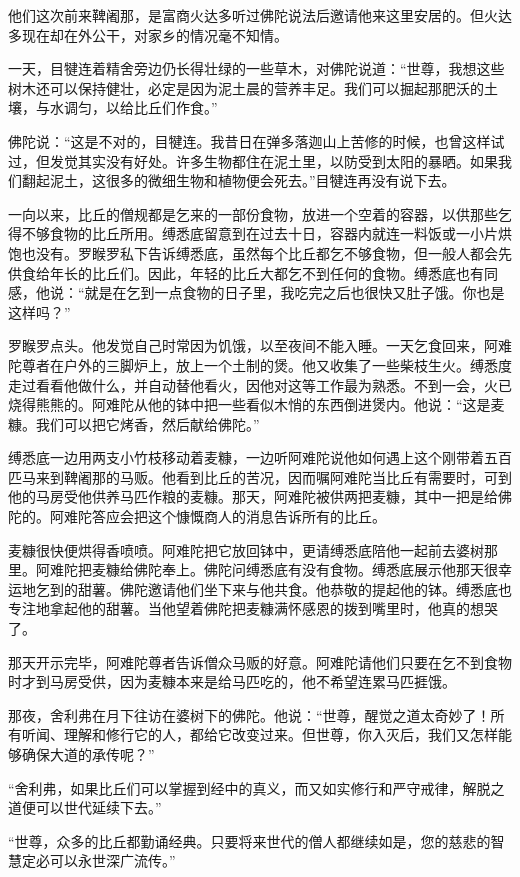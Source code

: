 \documentclass[12pt,twoside,openany]{book}
\begin{document}
他们这次前来鞞阇那，是富商火达多听过佛陀说法后邀请他来这里安居的。但火达多现在却在外公干，对家乡的情况毫不知情。

一天，目犍连着精舍旁边仍长得壮绿的一些草木，对佛陀说道：“世尊，我想这些树木还可以保持健壮，必定是因为泥土晨的营养丰足。我们可以掘起那肥沃的土壤，与水调匀，以给比丘们作食。”

佛陀说：“这是不对的，目犍连。我昔日在弹多落迦山上苦修的时候，也曾这样试过，但发觉其实没有好处。许多生物都住在泥土里，以防受到太阳的暴晒。如果我们翻起泥土，这很多的微细生物和植物便会死去。”目犍连再没有说下去。

一向以来，比丘的僧规都是乞来的一部份食物，放进一个空着的容器，以供那些乞得不够食物的比丘所用。缚悉底留意到在过去十日，容器内就连一料饭或一小片烘饱也没有。罗睺罗私下告诉缚悉底，虽然每个比丘都乞不够食物，但一般人都会先供食给年长的比丘们。因此，年轻的比丘大都乞不到任何的食物。缚悉底也有同感，他说：“就是在乞到一点食物的日子里，我吃完之后也很快又肚子饿。你也是这样吗？”

罗睺罗点头。他发觉自己时常因为饥饿，以至夜间不能入睡。一天乞食回来，阿难陀尊者在户外的三脚炉上，放上一个土制的煲。他又收集了一些柴枝生火。缚悉度走过看看他做什么，并自动替他看火，因他对这等工作最为熟悉。不到一会，火已烧得熊熊的。阿难陀从他的钵中把一些看似木悄的东西倒进煲内。他说：“这是麦糠。我们可以把它烤香，然后献给佛陀。”

缚悉底一边用两支小竹枝移动着麦糠，一边听阿难陀说他如何遇上这个刚带着五百匹马来到鞞阇那的马贩。他看到比丘的苦况，因而嘱阿难陀当比丘有需要时，可到他的马房受他供养马匹作粮的麦糠。那天，阿难陀被供两把麦糠，其中一把是给佛陀的。阿难陀答应会把这个慷慨商人的消息告诉所有的比丘。

麦糠很快便烘得香喷喷。阿难陀把它放回钵中，更请缚悉底陪他一起前去婆树那里。阿难陀把麦糠给佛陀奉上。佛陀问缚悉底有没有食物。缚悉底展示他那天很幸运地乞到的甜薯。佛陀邀请他们坐下来与他共食。他恭敬的提起他的钵。缚悉底也专注地拿起他的甜薯。当他望着佛陀把麦糠满怀感恩的拨到嘴里时，他真的想哭了。

那天开示完毕，阿难陀尊者告诉僧众马贩的好意。阿难陀请他们只要在乞不到食物时才到马房受供，因为麦糠本来是给马匹吃的，他不希望连累马匹捱饿。

那夜，舍利弗在月下往访在婆树下的佛陀。他说：“世尊，醒觉之道太奇妙了！所有听闻、理解和修行它的人，都给它改变过来。但世尊，你入灭后，我们又怎样能够确保大道的承传呢？”

“舍利弗，如果比丘们可以掌握到经中的真义，而又如实修行和严守戒律，解脱之道便可以世代延续下去。”

“世尊，众多的比丘都勤诵经典。只要将来世代的僧人都继续如是，您的慈悲的智慧定必可以永世深广流传。”
\end{document}
